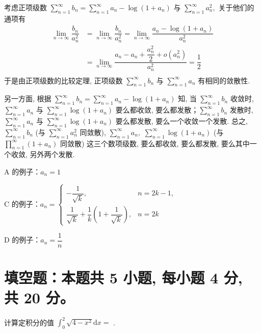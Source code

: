 \begin{solution}
  考虑正项级数 $\sum\limits_{n=1}^{\infty} b_n = \sum\limits_{n=1}^{\infty} a_n - \log(1 + a_n)$ 与 $\sum\limits_{n=1}^{\infty} a_n^2,$ 关于他们的通项有
  \begin{align*}
    \lim\limits_{n\to\infty} \dfrac{b_n}{a_n^2} & = \lim\limits_{n\to\infty} \dfrac{b_n}{a_n^2} = \lim\limits_{n\to\infty} \dfrac{a_n - \log(1 + a_n)}{a_n^2} \\
    & = \lim\limits_{n\to\infty} \dfrac{a_n - a_n + \dfrac{a_n^2}{2} + o(a_n^2)}{a_n^2} = \dfrac{1}{2} \\
  \end{align*}
  于是由正项级数的比较定理, 正项级数 $\sum\limits_{n=1}^{\infty} b_n$ 与 $\sum\limits_{n=1}^{\infty} a_n$ 有相同的敛散性.
  
  另一方面, 根据 $\sum\limits_{n=1}^{\infty} b_n = \sum\limits_{n=1}^{\infty} a_n - \log(1 + a_n)$ 知, 当 $\sum\limits_{n=1}^{\infty} b_n$ 收敛时, $\sum\limits_{n=1}^{\infty} a_n$ 与 $\sum\limits_{n=1}^{\infty} \log(1 + a_n)$ 要么都收敛, 要么都发散；$\sum\limits_{n=1}^{\infty} b_n$ 发散时, $\sum\limits_{n=1}^{\infty} a_n$ 与 $\sum\limits_{n=1}^{\infty} \log(1 + a_n)$ 要么都发散, 要么一个收敛一个发散. 总之, $\sum\limits_{n=1}^{\infty} b_n$ (与 $\sum\limits_{n=1}^{\infty} a_n^2$ 同敛散), $\sum\limits_{n=1}^{\infty} a_n,$ $\sum\limits_{n=1}^{\infty} \log(1 + a_n)$ (与 $\prod\limits_{n=1}^{\infty} (1 + a_n)$ 同敛散) 这三个数项级数, 要么都收敛, 要么都发散, 要么其中一个收敛, 另外两个发散.

  A 的例子：$a_n = 1$

  C 的例子：$a_n = \begin{cases}
    -\dfrac{1}{\sqrt{k}}, & n = 2k -1, \\
    \dfrac{1}{\sqrt{k}} + \dfrac{1}{k} \left( 1 + \dfrac{1}{\sqrt{k}} \right), & n = 2k
  \end{cases}$

  D 的例子：$a_n = \dfrac{1}{n}$
\end{solution}


\section{填空题：本题共 5 小题, 每小题 4 分, 共 20 分。}



\begin{question}
  计算定积分的值 $\int_{0}^{2} \sqrt{4 - x^2} \mathrm{d} x = $ \fillin[$\pi$].
\end{question}

